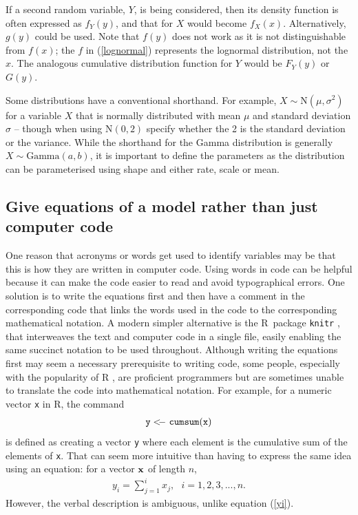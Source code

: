 \documentclass[12pt]{article}
\newcommand{\eb}{\begin{eqnarray}}
\newcommand{\ee}{\end{eqnarray}}
\begin{document}
If a second random 
variable, $Y$, is being considered, then its density function 
is often expressed as $f_Y(y)$, and that for $X$ would become $f_X(x)$. 
Alternatively, $g(y)$ could be used. Note that $f(y)$ does not work as it
is not distinguishable from $f(x)$; the $f$ in (\ref{lognormal}) 
represents the lognormal distribution, not the $x$. 
The analogous cumulative distribution function for $Y$ would
be $F_Y(y)$ or $G(y)$.

Some distributions have a conventional shorthand. For example, $X \sim
\mbox{N}(\mu, \sigma^2)$ for a variable $X$ that is normally distributed with
mean $\mu$ and standard deviation $\sigma$ -- though when using N$(0,2)$
specify whether the 2 is the standard deviation or the variance.
While the shorthand for the Gamma
distribution is generally $X \sim \mbox{Gamma}(a, b)$, it is important to define
the parameters as the distribution can be parameterised using shape and either
rate, scale or mean.

\subsection*{Give equations of a model rather than just computer code}

One reason that acronyms or words get used to identify variables may be
that this is how they are written in computer code. Using words in code 
can be helpful because it can make the code easier to read and avoid typographical
errors. One solution is to write the equations first and then have a 
comment in the corresponding code that links the words used in the code to the
corresponding mathematical
notation. A modern simpler alternative is the R~package {\tt knitr} \citep{xie18},
that interweaves the text and computer code in a
single file, easily enabling the same succinct notation to be used throughout.
Although writing the equations first may seem a necessary 
prerequisite to writing code, some people, especially with the popularity of R
\citep{R18}, are proficient programmers but are sometimes unable to translate the
code into mathematical notation. For example,
for a numeric vector {\tt x} in R, the command
\eb
\nonumber
{\tt y <\!\!\!- ~ cumsum(x)}
\label{cumsum}
\ee
is defined as creating a vector {\tt y} where each element is the cumulative sum
of the elements of {\tt x}. That can seem more intuitive than having to
express the same
idea using an equation: for a vector ${\bf x}$ of length $n$, 
\eb
y_i = \sum_{j=1}^i x_j, ~~~ i=1, 2, 3, ..., n.
\label{yi}
\ee
However, the verbal description is ambiguous, unlike equation (\ref{yi}).
\end{document}
